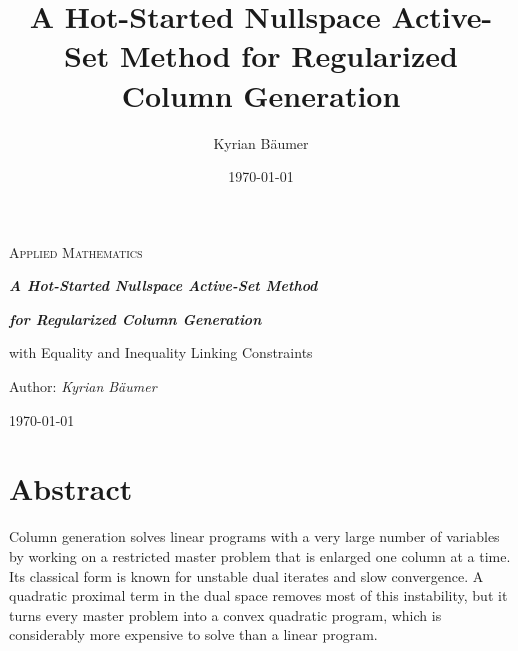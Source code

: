 \documentclass[11pt, openany]{book}
\title{A Hot-Started Nullspace Active-Set Method for Regularized Column Generation}
\author{Kyrian Bäumer}
\date{\today}
\theoremstyle{definition}
\begin{document}
\let\cleardoublepage\clearpage   %

\frontmatter

\begin{titlepage}
\begin{center}


\Large{\textsc{Applied Mathematics}}


\textbf{\huge{\em A Hot-Started Nullspace Active-Set Method}}

\bigskip\medskip

\textbf{\huge{\em for Regularized Column Generation}}

\bigskip\bigskip

\Large{with Equality and Inequality Linking Constraints}


\large{Author: \emph{Kyrian Bäumer}}


\textsc{\today}

\end{center}
\end{titlepage}


\chapter*{Abstract}

Column generation solves linear programs with a very large number of variables by working
on a restricted master problem that is enlarged one column at a time. Its classical form is
known for unstable dual iterates and slow convergence. A quadratic proximal term in the dual
space removes most of this instability, but it turns every master problem into a convex
quadratic program, which is considerably more expensive to solve than a linear program.

\medskip
\end{document}
